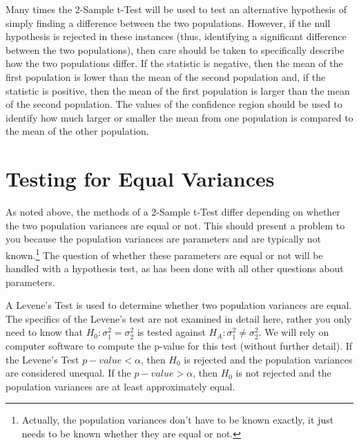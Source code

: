 \documentclass[10pt,openany]{book}\usepackage[]{graphicx}\usepackage[]{color}
\begin{document}
Many times the 2-Sample t-Test will be used to test an alternative hypothesis of simply finding a difference between the two populations.  However, if the null hypothesis is rejected in these instances (thus, identifying a significant difference between the two populations), then care should be taken to specifically describe how the two populations differ.  If the statistic is negative, then the mean of the first population is lower than the mean of the second population and, if the statistic is positive, then the mean of the first population is larger than the mean of the second population.  The values of the confidence region should be used to identify how much larger or smaller the mean from one population is compared to the mean of the other population.



\section{Testing for Equal Variances}\label{sect:LevenesTest}
\vspace{-12pt}
As noted above, the methods of a 2-Sample t-Test differ depending on whether the two population variances are equal or not.  This should present a problem to you because the population variances are parameters and are typically not known.\footnote{Actually, the population variances don't have to be known exactly, it just needs to be known whether they are equal or not.}  The question of whether these parameters are equal or not will be handled with a hypothesis test, as has been done with all other questions about parameters.


A Levene's Test is used to determine whether two population variances are equal. The specifics of the Levene's test are not examined in detail here, rather you only need to know that $H_{0}:\sigma_{1}^{2}=\sigma_{2}^{2}$ is tested against $H_{A}:\sigma_{1}^{2}\neq\sigma_{2}^{2}$.  We will rely on computer software to compute the p-value for this test (without further detail).  If the Levene's Test $p-value<\alpha$, then $H_{0}$ is rejected and the population variances are considered unequal. If the $p-value>\alpha$, then $H_{0}$ is not rejected and the population variances are at least approximately equal.
\end{document}
